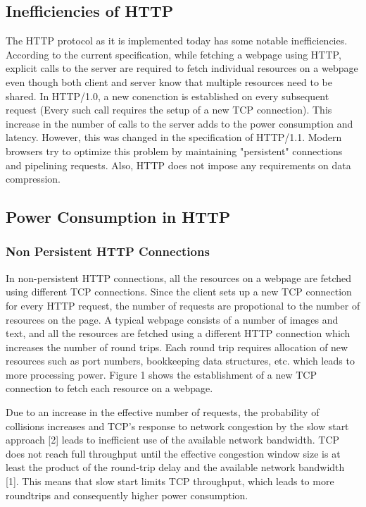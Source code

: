 \documentclass{sigplanconf}
\begin{document}
\subsection{Inefficiencies of HTTP}
The HTTP protocol as it is implemented today has some notable inefficiencies. According to the current specification, while fetching a webpage using HTTP, explicit calls to the server are required to fetch individual resources on a webpage even though both client and server know that multiple resources need to be shared. In HTTP/1.0, a new conenction is established on every subsequent request (Every such call requires the setup of a new TCP connection). This increase in the number of calls to the server adds to the power consumption and latency. However, this was changed in the specification of HTTP/1.1. Modern browsers try to  optimize this problem by maintaining "persistent" connections and pipelining requests. Also, HTTP does not  impose any requirements on data compression. 

\subsection{Power Consumption in HTTP}

\subsubsection{ Non Persistent HTTP Connections}

In non-persistent HTTP connections, all the resources on a webpage are fetched using different TCP connections. Since the client sets up a new TCP connection for every HTTP request, the number of requests are propotional to the number of resources on the page. A typical webpage consists of a number of images and text, and all the resources are fetched using a different HTTP connection which increases the number of round trips. Each round trip requires allocation of new resources such as port numbers, bookkeeping data structures, etc. which leads to more processing power. Figure 1 shows the establishment of a new TCP connection to fetch each resource on a webpage.

Due to an increase in the effective number of requests, the probability of collisions increases and TCP’s response to network congestion by the slow start approach [2] leads to inefficient use of the available network bandwidth. TCP does not reach full throughput until the effective congestion window size is at least the product of the round-trip delay and the available network bandwidth [1]. This means that slow start limits TCP throughput, which leads to more roundtrips and consequently higher power consumption.
\end{document}
